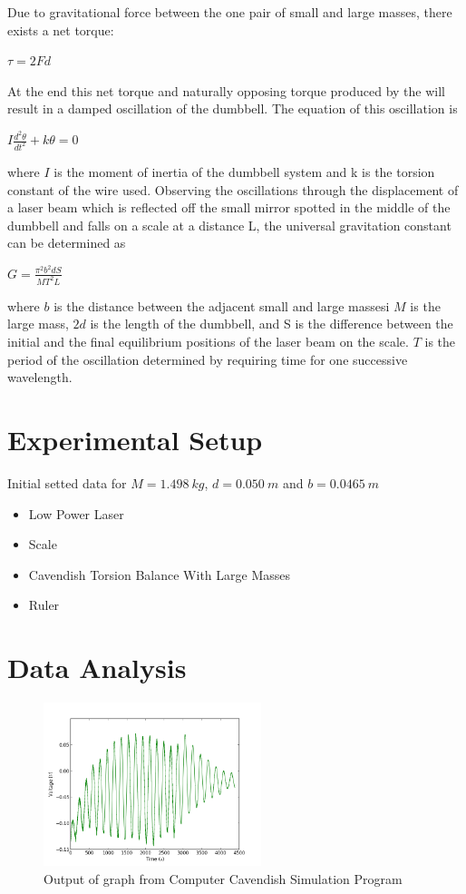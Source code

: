 \documentclass[aps,twocolumn,secnumarabic,nobalancelastpage,amsmath,amssymb,
nofootinbib]{revtex4}
\begin{document}
Due to gravitational force between the one pair of small and large masses, there exists a net torque:

\begin{center}
$\tau=2Fd$
\end{center}

At the end this net torque and naturally opposing torque produced by the will result in a damped oscillation of the dumbbell. The equation of this oscillation is

\begin{center}
$I\frac{{d}^{2}\theta}{d{t}^{2}}+k\theta=0 $
\end{center}

where $I$ is the moment of inertia of the dumbbell system and k is the torsion constant of the wire used. Observing the oscillations through the displacement of a laser beam which is reflected off the small mirror spotted in the middle of the dumbbell and falls on a scale at a distance L, the universal gravitation constant can be determined as

\begin{center}
$G=\frac{{\pi}^{2}{b}^{2}dS}{M{T}^{2}{L}}$
\end{center}

where $b$ is the distance between the adjacent small and large massesi $M$ is the large mass, $2d$ is the length of the dumbbell, and S is the difference between the initial and the final equilibrium positions of the laser beam on the scale. $T$ is the period of the oscillation determined by requiring time for one successive wavelength.


\section{Experimental Setup}
Initial setted data for $M=1.498\ kg$, $d=0.050\ m$ and $b=0.0465\ m$

\begin{itemize}
\item Low Power Laser
\item Scale
\item Cavendish Torsion Balance With Large Masses
\item Ruler
\end{itemize}


\section{Data Analysis}
\begin{figure}[htbp]
\includegraphics[width=2.5in]{figure_1}
\caption{Output of graph from Computer Cavendish Simulation Program}
\label{fig:schematic}
\end{figure}
\end{document}
